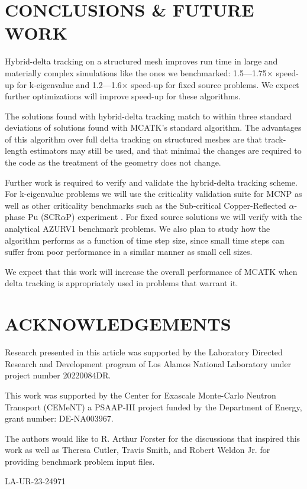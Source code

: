 \section{CONCLUSIONS \& FUTURE WORK}
Hybrid-delta tracking on a structured mesh improves run time in large and materially complex simulations like the ones we benchmarked: 1.5---1.75$\times$ speed-up for k-eigenvalue and 1.2---1.6$\times$ speed-up for fixed source problems.
We expect further optimizations will improve speed-up for these algorithms.

The solutions found with hybrid-delta tracking match to within three standard deviations of solutions found with MCATK's standard algorithm. 
The advantages of this algorithm over full delta tracking on structured meshes are that track-length estimators may still be used, and that minimal the changes are required to the code as the treatment of the geometry does not change.

Further work is required to verify and validate the hybrid-delta tracking scheme.
For k-eigenvalue problems we will use the criticality validation suite for MCNP \cite{mcnpCriticality} as well as other criticality benchmarks such as the Sub-critical Copper-Reflected $\alpha$-phase Pu (SCR$\alpha$P) experiment \cite{ICSBEP_2020}.
For fixed source solutions we will verify with the analytical AZURV1 \cite{ganapol_homogeneous_2001} benchmark problems. We also plan to study how the algorithm performs as a function of time step size, since small time steps can suffer from poor performance in a similar manner as small cell sizes.

We expect that this work will increase the overall performance of MCATK when delta tracking is appropriately used in problems that warrant it.

\section*{ACKNOWLEDGEMENTS}
Research presented in this article was supported by the Laboratory Directed Research and Development program of Los Alamos National Laboratory under project number 20220084DR.

This work was supported by the Center for Exascale Monte-Carlo Neutron Transport (CEMeNT) a PSAAP-III project funded by the Department of Energy, grant number: DE-NA003967.

The authors would like to R. Arthur Forster for the discussions that inspired this work as well as Theresa Cutler, Travis Smith, and Robert Weldon Jr. for providing benchmark problem input files.

LA-UR-23-24971
